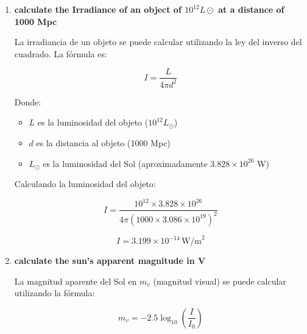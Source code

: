 \documentclass[11pt]{article}
\begin{document}
\begin{enumerate}
\[
K = \sigma T^4 (\frac{r_s}{a_0})^2
\]

Donde:
\begin{itemize}
    \item $\sigma$ es la constante de Stefan-Boltzmann ($5.67 \times 10^{-8} \, \text{W/m}^2\text{K}^4$)
    \item $T$ es la temperatura del Sol (aproximadamente 5778 K)
    \item $r_s$ es el radio del Sol (aproximadamente $6.96 \times 10^8$ m)
    \item $a_0$ es la distancia media entre la Tierra y el Sol (aproximadamente $1.496 \times 10^{11}$ m)
\end{itemize}

Calculando la constante solar:

\[
K = 5.67 \times 10^{-8} \times (5778)^4 \times \left(\frac{6.96 \times 10^8}{1.496 \times 10^{11}}\right)^2
\]

\[K \approx 1361 \, \text{W/m}^2
\]

    \item \textbf{calculate the Irradiance of an object of $10^{12} L \odot$ at a distance of 1000 Mpc}
    
La irradiancia de un objeto se puede calcular utilizando la ley del inverso del cuadrado. La fórmula es:

\[
I = \frac{L}{4 \pi d^2}
\]

Donde:
\begin{itemize}
    \item $L$ es la luminosidad del objeto ($10^{12} L_\odot$)
    \item $d$ es la distancia al objeto (1000 Mpc)
    \item $L_\odot$ es la luminosidad del Sol (aproximadamente $3.828 \times 10^{26}$ W)
\end{itemize}

Calculando la luminosidad del objeto:

\[
I = \frac{10^{12} \times 3.828 \times 10^{26}}{4 \pi (1000 \times 3.086 \times 10^{19})^2}
\]

\[
I = 3.199 \times 10^{-14} \, \text{W/m}^2
\]

    \item \textbf{calculate the sun’s apparent magnitude in V}
    
La magnitud aparente del Sol en $m_v$ (magnitud visual) se puede calcular utilizando la fórmula:

\[
m_v = -2.5 \log_{10}\left(\frac{I}{I_0}\right)
\]


\end{enumerate}
\end{document}
